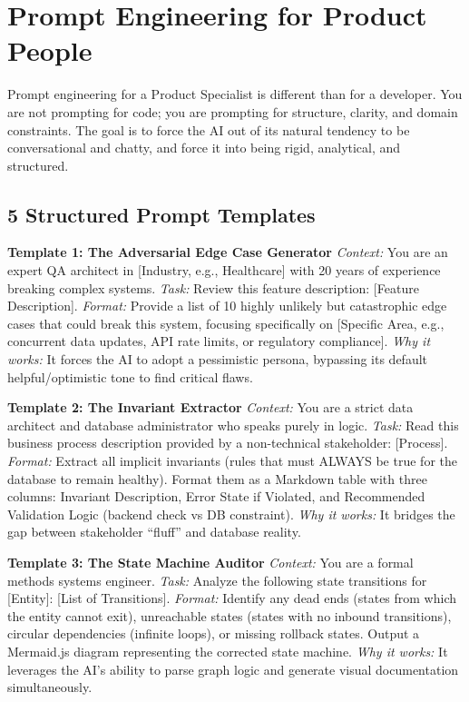 \documentclass[
  11pt,
  openany,
  oneside]{book}
\begin{document}
\section{Prompt Engineering for Product
People}\label{prompt-engineering-for-product-people}

Prompt engineering for a Product Specialist is different than for a
developer. You are not prompting for code; you are prompting for
structure, clarity, and domain constraints. The goal is to force the AI
out of its natural tendency to be conversational and chatty, and force
it into being rigid, analytical, and structured.

\subsection{5 Structured Prompt
Templates}\label{structured-prompt-templates}

\textbf{Template 1: The Adversarial Edge Case Generator} \emph{Context:}
You are an expert QA architect in {[}Industry, e.g., Healthcare{]} with
20 years of experience breaking complex systems. \emph{Task:} Review
this feature description: {[}Feature Description{]}. \emph{Format:}
Provide a list of 10 highly unlikely but catastrophic edge cases that
could break this system, focusing specifically on {[}Specific Area,
e.g., concurrent data updates, API rate limits, or regulatory
compliance{]}. \emph{Why it works:} It forces the AI to adopt a
pessimistic persona, bypassing its default helpful/optimistic tone to
find critical flaws.

\textbf{Template 2: The Invariant Extractor} \emph{Context:} You are a
strict data architect and database administrator who speaks purely in
logic. \emph{Task:} Read this business process description provided by a
non-technical stakeholder: {[}Process{]}. \emph{Format:} Extract all
implicit invariants (rules that must ALWAYS be true for the database to
remain healthy). Format them as a Markdown table with three columns:
Invariant Description, Error State if Violated, and Recommended
Validation Logic (backend check vs DB constraint). \emph{Why it works:}
It bridges the gap between stakeholder ``fluff'' and database reality.

\textbf{Template 3: The State Machine Auditor} \emph{Context:} You are a
formal methods systems engineer. \emph{Task:} Analyze the following
state transitions for {[}Entity{]}: {[}List of Transitions{]}.
\emph{Format:} Identify any dead ends (states from which the entity
cannot exit), unreachable states (states with no inbound transitions),
circular dependencies (infinite loops), or missing rollback states.
Output a Mermaid.js diagram representing the corrected state machine.
\emph{Why it works:} It leverages the AI's ability to parse graph logic
and generate visual documentation simultaneously.
\end{document}
